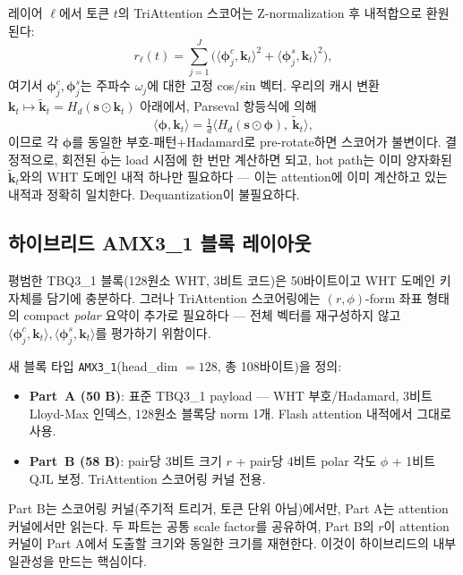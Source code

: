 \documentclass[10pt,twocolumn]{article}
\begin{document}
레이어 $\ell$에서 토큰 $t$의 TriAttention 스코어는 Z-normalization 후 내적합으로 환원된다:
\begin{equation}
r_\ell(t) = \sum_{j=1}^{J} \big( \langle \boldsymbol{\phi}^c_j, \mathbf{k}_t \rangle^2 + \langle \boldsymbol{\phi}^s_j, \mathbf{k}_t \rangle^2 \big),
\end{equation}
여기서 $\boldsymbol{\phi}^c_j, \boldsymbol{\phi}^s_j$는 주파수 $\omega_j$에 대한 고정 cos/sin 벡터. 우리의 캐시 변환 $\mathbf{k}_t \mapsto \tilde{\mathbf{k}}_t = H_d (\mathbf{s} \odot \mathbf{k}_t)$ 아래에서, Parseval 항등식에 의해
\begin{equation}
\langle \boldsymbol{\phi}, \mathbf{k}_t \rangle = \tfrac{1}{d}\langle H_d (\mathbf{s} \odot \boldsymbol{\phi}),\ \tilde{\mathbf{k}}_t \rangle,
\end{equation}
이므로 각 $\boldsymbol{\phi}$를 동일한 부호-패턴+Hadamard로 pre-rotate하면 스코어가 불변이다. 결정적으로, 회전된 $\tilde{\boldsymbol{\phi}}$는 load 시점에 한 번만 계산하면 되고, hot path는 이미 양자화된 $\tilde{\mathbf{k}}_t$와의 WHT 도메인 내적 하나만 필요하다 --- 이는 attention에 이미 계산하고 있는 내적과 정확히 일치한다. Dequantization이 불필요하다.

\subsection{하이브리드 AMX3\_1 블록 레이아웃}

평범한 TBQ3\_1 블록(128원소 WHT, 3비트 코드)은 50바이트이고 WHT 도메인 키 자체를 담기에 충분하다. 그러나 TriAttention 스코어링에는 $(r, \phi)$-form 좌표 형태의 compact \emph{polar} 요약이 추가로 필요하다 --- 전체 벡터를 재구성하지 않고 $\langle \boldsymbol{\phi}^c_j, \mathbf{k}_t \rangle, \langle \boldsymbol{\phi}^s_j, \mathbf{k}_t \rangle$를 평가하기 위함이다.

새 블록 타입 \texttt{AMX3\_1}(head\_dim $=128$, 총 108바이트)을 정의:
\begin{itemize}[leftmargin=*,topsep=2pt,itemsep=1pt]
\item \textbf{Part~A (50 B)}: 표준 TBQ3\_1 payload --- WHT 부호/Hadamard, 3비트 Lloyd-Max 인덱스, 128원소 블록당 norm 1개. Flash attention 내적에서 그대로 사용.
\item \textbf{Part~B (58 B)}: pair당 3비트 크기 $r$ + pair당 4비트 polar 각도 $\phi$ + 1비트 QJL 보정. TriAttention 스코어링 커널 전용.
\end{itemize}

Part B는 스코어링 커널(주기적 트리거, 토큰 단위 아님)에서만, Part A는 attention 커널에서만 읽는다. 두 파트는 공통 scale factor를 공유하여, Part B의 $r$이 attention 커널이 Part A에서 도출할 크기와 동일한 크기를 재현한다. 이것이 하이브리드의 내부 일관성을 만드는 핵심이다.
\end{document}
